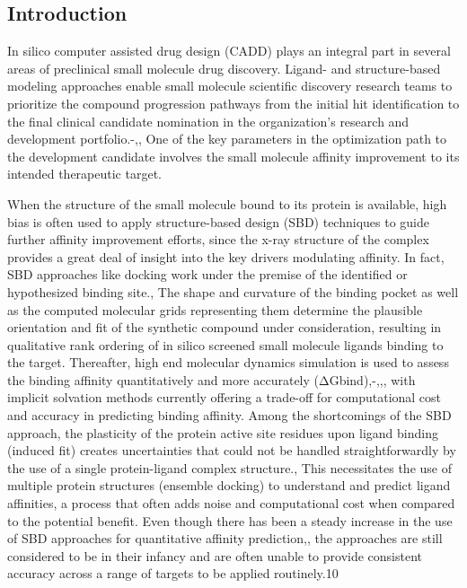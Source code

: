 \subsection{Introduction}

In silico computer assisted drug design (CADD) plays an integral part in several areas of preclinical small molecule drug discovery.  Ligand- and structure-based modeling approaches enable small molecule scientific discovery research teams to prioritize the compound progression pathways from the initial hit identification to the final clinical candidate nomination in the organization’s research and development portfolio.-,,  One of the key parameters in the optimization path to the development candidate involves the small molecule affinity improvement to its intended therapeutic target.  

When the structure of the small molecule bound to its protein is available, high bias is often used to apply structure-based design (SBD) techniques to guide further affinity improvement efforts, since the x-ray structure of the complex provides a great deal of insight into the key drivers modulating affinity.  In fact, SBD approaches like docking work under the premise of the identified or hypothesized binding site.,  The shape and curvature of the binding pocket as well as the computed molecular grids representing them determine the plausible orientation and fit of the synthetic compound under consideration, resulting in qualitative rank ordering of in silico screened small molecule ligands binding to the target.  Thereafter, high end molecular dynamics simulation is used to assess the binding affinity quantitatively and more accurately (ΔGbind),-,,, with implicit solvation methods currently offering a trade-off for computational cost and accuracy in predicting binding affinity.  Among the shortcomings of the SBD approach, the plasticity of the protein active site residues upon ligand binding (induced fit) creates uncertainties that could not be handled straightforwardly by the use of a single protein-ligand complex structure.,  This necessitates the use of multiple protein structures (ensemble docking) to understand and predict ligand affinities, a process that often adds noise and computational cost when compared to the potential benefit.  Even though there has been a steady increase in the use of SBD approaches for quantitative affinity prediction,, the approaches are still considered to be in their infancy and are often unable to provide consistent accuracy across a range of targets to be applied routinely.10  

